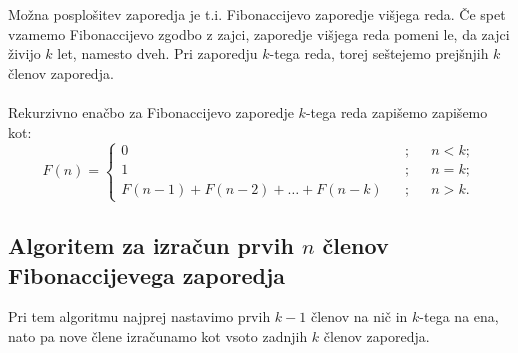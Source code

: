 \documentclass[10pt,a4paper,oneside]{book}
\begin{document}
Možna posplošitev zaporedja je t.i. Fibonaccijevo zaporedje višjega reda. Če spet vzamemo Fibonaccijevo zgodbo z zajci, zaporedje višjega reda pomeni le, da zajci živijo $k$ let, namesto dveh. Pri zaporedju $k$-tega reda, torej seštejemo prejšnjih $k$ členov zaporedja.\\
 \\
Rekurzivno enačbo za Fibonaccijevo zaporedje $k$-tega reda zapišemo zapišemo kot:\\
\[	F(n)=
	\left\{
		\begin{matrix}
			0 && ; && n<k;\\
			1 && ; && n=k;\\
			F(n-1)+F(n-2)+\dots+F(n-k) &&; && n>k.
		\end{matrix}
	\right. \]
\subsection{Algoritem za izračun prvih $n$ členov Fibonaccijevega zaporedja}
Pri tem algoritmu najprej nastavimo prvih $k-1$ členov na nič in $k$-tega na ena, nato pa nove člene izračunamo kot vsoto zadnjih $k$ členov zaporedja.

\end{document}
